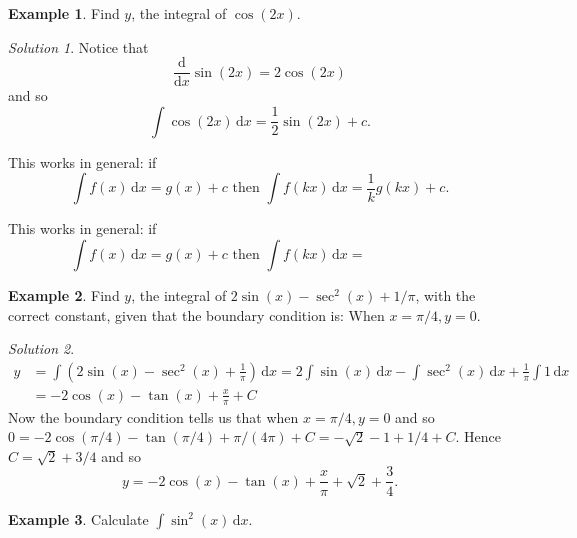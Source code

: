 \documentclass[
  english,
  11pt,
  oneside]{book}
\newcommand{\slide}{}
\theoremstyle{definition}
\theoremstyle{definition}
\newtheorem{example}{Example}[chapter]
\theoremstyle{definition}
\theoremstyle{definition}
\theoremstyle{remark}
\newtheorem*{solution}{Solution}
\begin{document}
\slide

\begin{example}
\protect\hypertarget{exm:cos-example}{}\label{exm:cos-example}Find \(y\), the integral of \(\cos(2x)\).
\end{example}

\begin{solution}
Notice that
\[\frac{\mathrm{d}}{\mathrm{d}x}\sin(2x) = 2\cos(2x)\]
and so
\[\int\cos(2x)\,\mathrm{d}x = \frac12\sin(2x)+c.\]
\end{solution}

\begin{notslides}

This works in general: if
\[\int f(x)\,\mathrm{d}x = g(x) + c\text{ then }\int f(kx)\,\mathrm{d}x = \frac1kg(kx) + c.\]

\end{notslides}

\begin{slidesonly}

This works in general: if
\[\int f(x)\,\mathrm{d}x = g(x) + c\text{ then }\int f(kx)\,\mathrm{d}x = \phantom{\frac1kg(kx) + c.}\]
\slide

\end{slidesonly}

\begin{example}
Find \(y\), the integral of \(2\sin(x) - \sec^2(x)+1/\pi\), with the correct constant, given that the boundary condition is:
When \(x = \pi/4, y = 0\).
\end{example}

\begin{solution}
\begin{align*}
y& = \int(2\sin(x) - \sec^2(x)+\frac1{\pi})\,\mathrm{d}x = 2\int \sin(x)\,\mathrm{d}x - \int \sec^2(x)\,\mathrm{d}x + \frac{1}{\pi}\int 1\,\mathrm{d}x\\
&= -2\cos(x)-\tan(x)+\frac{x}{\pi}+C
\end{align*}
Now the boundary condition tells us that when \(x=\pi/4, y = 0\) and so \(0=-2\cos(\pi/4)-\tan(\pi/4)+\pi/(4\pi)+C = -\sqrt{2}-1+1/4+C\). Hence \(C=\sqrt{2}+3/4\) and so
\[y = -2\cos(x)-\tan(x)+\frac{x}{\pi}+\sqrt{2}+\frac34.\]
\end{solution}

\slide

\begin{example}
Calculate \(\displaystyle\int\sin^2(x)\,\mathrm{d}x\).
\end{example}
\end{document}
